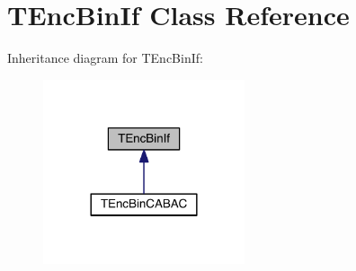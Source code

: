 \hypertarget{class_t_enc_bin_if}{}\section{T\+Enc\+Bin\+If Class Reference}
\label{class_t_enc_bin_if}


Inheritance diagram for T\+Enc\+Bin\+If\+:
\nopagebreak
\begin{figure}[H]
\begin{center}
\leavevmode
\includegraphics[width=168pt]{d1/d35/class_t_enc_bin_if__inherit__graph}
\end{center}
\end{figure}
